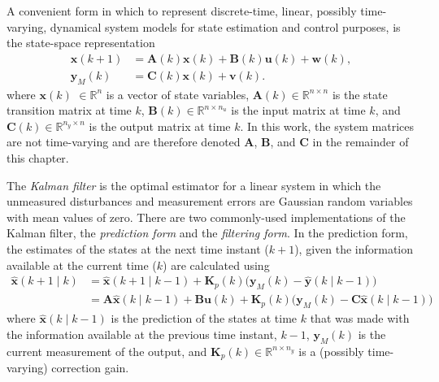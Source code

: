 {A convenient form in which to represent discrete-time, linear, possibly time-varying, dynamical system models for state estimation and control purposes, is the state-space representation
\begin{equation} \label{eq:ss_rep_uwy}
	\begin{aligned}
		\mathbf{x}(k+1) &= \mathbf{A}(k) \mathbf{x}(k) + \mathbf{B}(k) \mathbf{u}(k) + \mathbf{w}(k), \\
		\mathbf{y}_M(k) &= \mathbf{C}(k) \mathbf{x}(k) + \mathbf{v}(k).
	\end{aligned}
\end{equation}
%
%
%
%
where $\mathbf{x}(k)$ $\in \mathbb{R}^n$ is a vector of state variables, $\mathbf{A}(k) \in \mathbb{R}^{n \times n}$ is the state transition matrix at time $k$, $\mathbf{B}(k) \in \mathbb{R}^{n \times n_u}$ is the input matrix at time $k$, and $\mathbf{C}(k) \in \mathbb{R}^{n_y \times n}$ is the output matrix at time $k$. In this work, the system matrices are not time-varying and are therefore denoted $\mathbf{A}$, $\mathbf{B}$, and $\mathbf{C}$ in the remainder of this chapter.

The \textit{Kalman filter} \citep{kalman_new_1960} is the optimal estimator for a linear system in which the unmeasured disturbances and measurement errors are Gaussian random variables with mean values of zero. There are two commonly-used implementations of the Kalman filter, the \textit{prediction form} and the \textit{filtering form}. In the prediction form, the estimates of the states at the next time instant ($k+1$), given the information available at the current time ($k$) are calculated using
\begin{equation}
\begin{aligned} \label{eq:xkp1_hat_p}
	\mathbf{\hat{x}}(k+1 \mid k) &= \mathbf{\hat{x}}(k+1 \mid k-1) + \mathbf{K}_p(k) \big( \mathbf{y}_M(k) - \mathbf{\hat{y}}(k \mid k-1) \big) \\
	&= \mathbf{A}\mathbf{\hat{x}}(k \mid k-1) + \mathbf{B}\mathbf{u}(k) + \mathbf{K}_p(k) \big( \mathbf{y}_M(k) - \mathbf{C} \mathbf{\hat{x}}(k \mid k-1) \big)
\end{aligned}
\end{equation}
%
where $\hat{\mathbf{x}}(k \mid k-1)$ is the prediction of the states at time $k$ that was made with the information available at the previous time instant, $k-1$, $\mathbf{y}_M(k)$ is the current measurement of the output, and $\mathbf{K}_p(k) \in \mathbb{R}^{n \times n_y}$ is a (possibly time-varying) correction gain.
%

}
